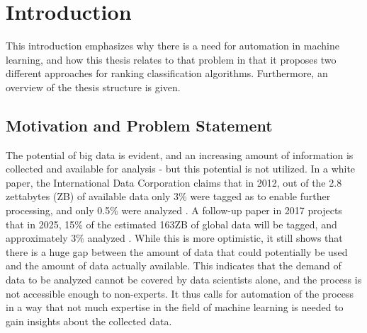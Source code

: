 \chapter{Introduction}
\label{sec:intro}
This introduction emphasizes why there is a need for automation in machine learning, and how this thesis relates to that problem in that it proposes two different approaches for ranking classification algorithms. Furthermore, an overview of the thesis structure is given.

\section{Motivation and Problem Statement}
\label{sec:intro:motivation}
The potential of big data is evident, and an increasing amount of information is collected and available for analysis - but this potential is not utilized. In a white paper, the International Data Corporation claims that in 2012, out of the 2.8 zettabytes (ZB) of available data only 3\% were tagged as to enable further processing, and only 0.5\% were analyzed \cite{gantz2012the}. A follow-up paper in 2017 projects that in 2025, 15\% of the estimated 163ZB of global data will be tagged, and approximately 3\% analyzed \cite{gantz2017data}. While this is more optimistic, it still shows that there is a huge gap between the amount of data that could potentially be used and the amount of data actually available. This indicates that the demand of data to be analyzed cannot be covered by data scientists alone, and the process is not accessible enough to non-experts. It thus calls for automation of the process in a way that not much expertise in the field of machine learning is needed to gain insights about the collected data.

